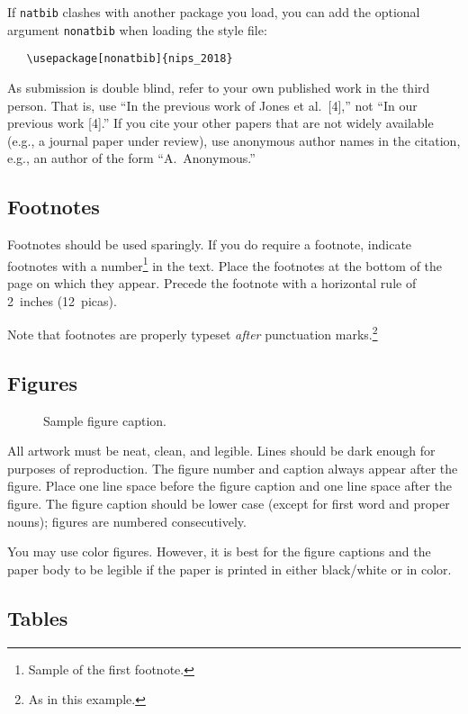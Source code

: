 \documentclass{article}
\begin{document}
If \verb+natbib+ clashes with another package you load, you can add
the optional argument \verb+nonatbib+ when loading the style file:
\begin{verbatim}
   \usepackage[nonatbib]{nips_2018}
\end{verbatim}

As submission is double blind, refer to your own published work in the
third person. That is, use ``In the previous work of Jones et
al.\ [4],'' not ``In our previous work [4].'' If you cite your other
papers that are not widely available (e.g., a journal paper under
review), use anonymous author names in the citation, e.g., an author
of the form ``A.\ Anonymous.''

\subsection{Footnotes}

Footnotes should be used sparingly.  If you do require a footnote,
indicate footnotes with a number\footnote{Sample of the first
  footnote.} in the text. Place the footnotes at the bottom of the
page on which they appear.  Precede the footnote with a horizontal
rule of 2~inches (12~picas).

Note that footnotes are properly typeset \emph{after} punctuation
marks.\footnote{As in this example.}

\subsection{Figures}

\begin{figure}
  \centering
  \fbox{\rule[-.5cm]{0cm}{4cm} \rule[-.5cm]{4cm}{0cm}}
  \caption{Sample figure caption.}
\end{figure}

All artwork must be neat, clean, and legible. Lines should be dark
enough for purposes of reproduction. The figure number and caption
always appear after the figure. Place one line space before the figure
caption and one line space after the figure. The figure caption should
be lower case (except for first word and proper nouns); figures are
numbered consecutively.

You may use color figures.  However, it is best for the figure
captions and the paper body to be legible if the paper is printed in
either black/white or in color.

\subsection{Tables}
\end{document}
